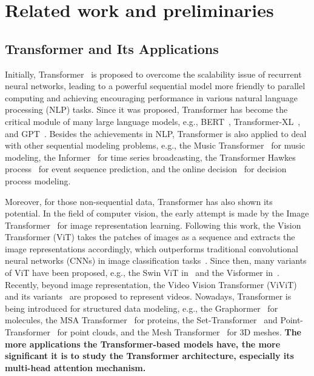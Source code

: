 \section{Related work and preliminaries}\label{sec:related}
\subsection{Transformer and Its Applications}
Initially, Transformer~\cite{vaswani2017attention} is proposed to overcome the scalability issue of recurrent neural networks, leading to a powerful sequential model more friendly to parallel computing and achieving encouraging performance in various natural language processing (NLP) tasks. 
Since it was proposed, Transformer has become the critical module of many large language models, e.g., BERT~\cite{devlin2019bert}, Transformer-XL~\cite{dai2019transformer}, and GPT~\cite{brown2020language}. 
Besides the achievements in NLP, Transformer is also applied to deal with other sequential modeling problems, e.g., the Music Transformer~\cite{huang2018music} for music modeling, the Informer~\cite{zhang2021informer} for time series broadcasting, the Transformer Hawkes process~\cite{zuo2020transformer} for event sequence prediction, and the online decision~\cite{zheng2022online} for decision process modeling. 

Moreover, for those non-sequential data, Transformer has also shown its potential.
In the field of computer vision, the early attempt is made by the Image Transformer~\cite{parmar2018image} for image representation learning. 
Following this work, the Vision Transformer (ViT) takes the patches of images as a sequence and extracts the image representations accordingly, which outperforms traditional convolutional neural networks (CNNs) in image classification tasks~\cite{dosovitskiy2021an}.
Since then, many variants of ViT have been proposed, e.g., the Swin ViT in~\cite{liu2021swin} and the Visformer in~\cite{chen2021visformer}. 
Recently, beyond image representation, the Video Vision Transformer (ViViT)~\cite{arnab2021vivit} and its variants~\cite{liu2022video} are proposed to represent videos.
Nowadays, Transformer is being introduced for structured data modeling, e.g., the Graphormer~\cite{ying2021transformers} for molecules, the MSA Transformer~\cite{rao2021msa} for proteins, the Set-Transformer~\cite{lee2019set} and Point-Transformer~\cite{zhao2021point} for point clouds, and the Mesh Transformer~\cite{lin2021mesh} for 3D meshes. 
\textbf{The more applications the Transformer-based models have, the more significant it is to study the Transformer architecture, especially its multi-head attention mechanism.}


